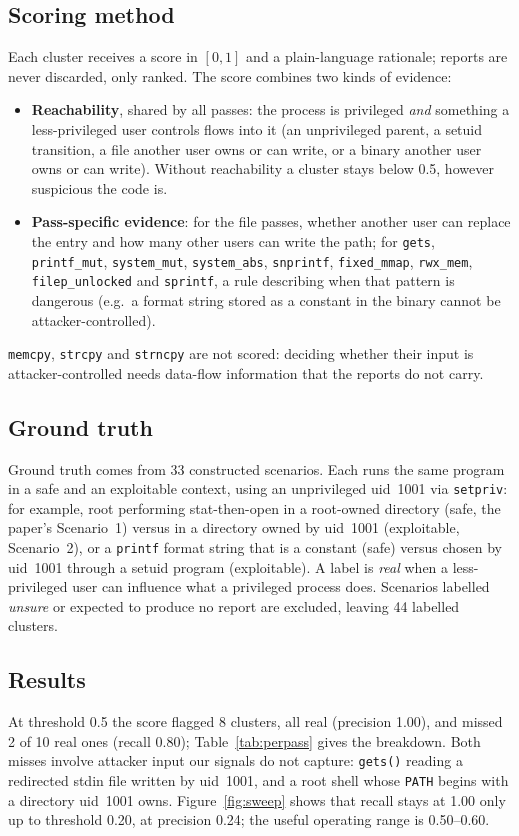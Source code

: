 \documentclass[11pt,a4paper]{article}
\newcommand{\pass}[1]{\texttt{#1}}
\begin{document}
\subsection{Scoring method}
Each cluster receives a score in $[0,1]$ and a plain-language rationale; reports are never
discarded, only ranked. The score combines two kinds of evidence:
\begin{itemize}
  \item \textbf{Reachability}, shared by all passes: the process is privileged \emph{and} something
  a less-privileged user controls flows into it (an unprivileged parent, a setuid transition, a file
  another user owns or can write, or a binary another user owns or can write). Without
  reachability a cluster stays below 0.5, however suspicious the code is.
  \item \textbf{Pass-specific evidence}: for the file passes, whether another user can replace the
  entry and how many other users can write the path; for \pass{gets}, \pass{printf\_mut},
  \pass{system\_mut}, \pass{system\_abs}, \pass{snprintf}, \pass{fixed\_mmap}, \pass{rwx\_mem},
  \pass{filep\_unlocked} and \pass{sprintf}, a rule describing when that pattern is dangerous
  (e.g.\ a format string stored as a constant in the binary cannot be attacker-controlled).
\end{itemize}
\pass{memcpy}, \pass{strcpy} and \pass{strncpy} are not scored: deciding whether their input is
attacker-controlled needs data-flow information that the reports do not carry.

\subsection{Ground truth}
Ground truth comes from 33 constructed scenarios. Each runs the same program in a safe and an
exploitable context, using an unprivileged uid~1001 via \texttt{setpriv}: for example, root
performing stat-then-open in a root-owned directory (safe, the paper's Scenario~1) versus in a
directory owned by uid~1001 (exploitable, Scenario~2), or a \texttt{printf} format string that is
a constant (safe) versus chosen by uid~1001 through a setuid program (exploitable). A label is
\emph{real} when a less-privileged user can influence what a privileged process does. Scenarios
labelled \emph{unsure} or expected to produce no report are excluded, leaving 44 labelled clusters.

\subsection{Results}
At threshold 0.5 the score flagged 8 clusters, all real (precision 1.00), and missed 2 of 10 real
ones (recall 0.80); Table~\ref{tab:perpass} gives the breakdown. Both misses involve attacker input
our signals do not capture: \texttt{gets()} reading a redirected stdin file written by uid~1001, and
a root shell whose \texttt{PATH} begins with a directory uid~1001 owns. Figure~\ref{fig:sweep}
shows that recall stays at 1.00 only up to threshold 0.20, at precision 0.24; the useful operating
range is 0.50--0.60.
\end{document}

